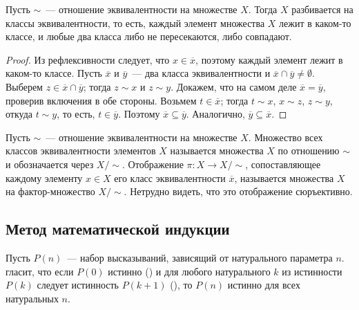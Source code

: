 \begin{theorem}\label{thm_quotient_set}
Пусть $\sim$~--- отношение эквивалентности на множестве $X$.
Тогда $X$ разбивается на классы эквивалентности, то есть, каждый
элемент множества $X$ лежит в каком-то классе, и любые два класса либо
не пересекаются, либо совпадают.
\end{theorem}
\begin{proof}
Из рефлексивности следует, что $x\in\overline{x}$, поэтому каждый
элемент лежит в каком-то классе. Пусть $\overline{x}$ и
$\overline{y}$~--- два класса эквивалентности и
$\overline{x}\cap\overline{y}\neq\emptyset$. Выберем
$z\in\overline{x}\cap\overline{y}$; тогда $z\sim x$ и $z\sim
y$. Докажем, что на самом деле $\overline{x}=\overline{y}$, проверив
включения в обе стороны. Возьмем $t\in\overline{x}$; тогда $t\sim
x$, $x\sim z$, $z\sim y$, откуда $t\sim y$, то есть,
$t\in\overline{y}$. Поэтому
$\overline{x}\subseteq\overline{y}$. Аналогично,
$\overline{y}\subseteq\overline{x}$.
\end{proof}

\begin{definition}\label{def_quotient_set}
Пусть $\sim$~--- отношение эквивалентности на множестве $X$.
Множество всех классов эквивалентности элементов $X$ называется
 множества $X$ по
отношению $\sim$ и
обозначается через $X/\sim$. Отображение $\pi\colon X\to X/\sim$,
сопоставляющее каждому элементу $x\in X$ его класс эквивалентности
$\overline{x}$, называется
 множества
$X$ на фактор-множество $X/\sim$. Нетрудно видеть, что это отображение
сюръективно.
\end{definition}

\subsection{Метод математической индукции}


Пусть $P(n)$~--- набор высказываний, зависящий от натурального
параметра $n$.  гласит, что если
$P(0)$
истинно () и для любого
натурального $k$ из истинности $P(k)$ следует истинность
$P(k+1)$ (), то
$P(n)$
истинно для всех натуральных $n$.

